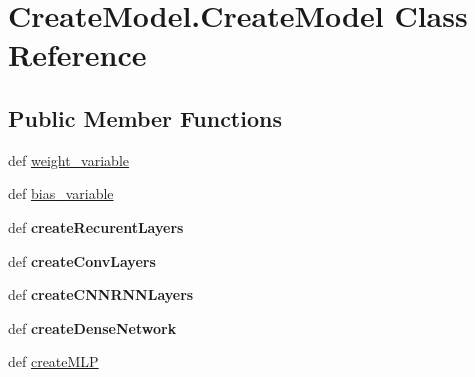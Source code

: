 \hypertarget{classCreateModel_1_1CreateModel}{\section{Create\-Model.\-Create\-Model Class Reference}
\label{classCreateModel_1_1CreateModel}
}
\subsection*{Public Member Functions}
\begin{DoxyCompactItemize}
\item 
def \hyperlink{classCreateModel_1_1CreateModel_ae868f99ce147ab3b0ff73c515006ba16}{weight\-\_\-variable}
\item 
def \hyperlink{classCreateModel_1_1CreateModel_a9cd7bb38d38886a36f8036aec997b566}{bias\-\_\-variable}
\item 
\hypertarget{classCreateModel_1_1CreateModel_afe92bae79b5fd702e02a43a5936df994}{def {\bfseries create\-Recurent\-Layers}}\label{classCreateModel_1_1CreateModel_afe92bae79b5fd702e02a43a5936df994}

\item 
\hypertarget{classCreateModel_1_1CreateModel_ae75976731946bd47ca90a966f2a8e261}{def {\bfseries create\-Conv\-Layers}}\label{classCreateModel_1_1CreateModel_ae75976731946bd47ca90a966f2a8e261}

\item 
\hypertarget{classCreateModel_1_1CreateModel_a86e1bd0898957507096454cd034a89dc}{def {\bfseries create\-C\-N\-N\-R\-N\-N\-Layers}}\label{classCreateModel_1_1CreateModel_a86e1bd0898957507096454cd034a89dc}

\item 
\hypertarget{classCreateModel_1_1CreateModel_a0cec7ff4bfd516b73c48f92d321bd23d}{def {\bfseries create\-Dense\-Network}}\label{classCreateModel_1_1CreateModel_a0cec7ff4bfd516b73c48f92d321bd23d}

\item 
\hypertarget{classCreateModel_1_1CreateModel_a7a829ae167a06dbcfec7c16e39e4690e}{def \hyperlink{classCreateModel_1_1CreateModel_a7a829ae167a06dbcfec7c16e39e4690e}{create\-M\-L\-P}}\label{classCreateModel_1_1CreateModel_a7a829ae167a06dbcfec7c16e39e4690e}


\end{DoxyCompactItemize}
